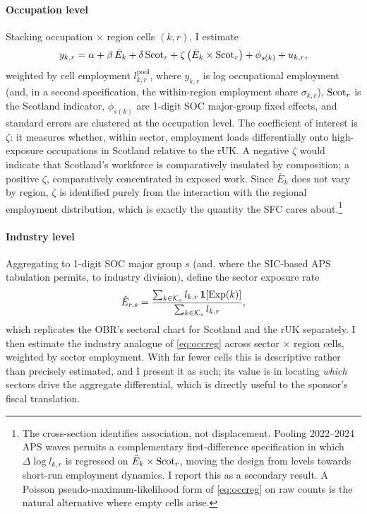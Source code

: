 \paragraph{Occupation level} Stacking occupation $\times$ region cells $(k,r)$, I estimate
\begin{equation}
y_{k,r}=\alpha+\beta\,\bar E_k+\delta\,\mathrm{Scot}_r+\zeta\,\big(\bar E_k\times \mathrm{Scot}_r\big)+\phi_{s(k)}+u_{k,r},
\label{eq:occreg}
\end{equation}
weighted by cell employment $l^{\mathrm{pool}}_{k,r}$, where $y_{k,r}$ is log occupational employment (and, in a second specification, the within-region employment share $\sigma_{k,r}$), $\mathrm{Scot}_r$ is the Scotland indicator, $\phi_{s(k)}$ are 1-digit SOC major-group fixed effects, and standard errors are clustered at the occupation level. The coefficient of interest is $\zeta$: it measures whether, within sector, employment loads differentially onto high-exposure occupations in Scotland relative to the rUK. A negative $\zeta$ would indicate that Scotland's workforce is comparatively insulated by composition; a positive $\zeta$, comparatively concentrated in exposed work. Since $\bar E_k$ does not vary by region, $\zeta$ is identified purely from the interaction with the regional employment distribution, which is exactly the quantity the SFC cares about.\footnote{The cross-section identifies association, not displacement. Pooling 2022--2024 APS waves permits a complementary first-difference specification in which $\Delta\log l_{k,r}$ is regressed on $\bar E_k\times\mathrm{Scot}_r$, moving the design from levels towards short-run employment dynamics. I report this as a secondary result. A Poisson pseudo-maximum-likelihood form of \eqref{eq:occreg} on raw counts is the natural alternative where empty cells arise.}

\paragraph{Industry level} Aggregating to 1-digit SOC major group $s$ (and, where the SIC-based APS tabulation permits, to industry division), define the sector exposure rate
\begin{equation}
\hat E_{r,s}=\frac{\sum_{k\in\mathcal{K}_s} l_{k,r}\,\mathbf{1}[\mathrm{Exp}(k)]}{\sum_{k\in\mathcal{K}_s} l_{k,r}},
\end{equation}
which replicates the OBR's sectoral chart for Scotland and the rUK separately. I then estimate the industry analogue of \eqref{eq:occreg} across sector $\times$ region cells, weighted by sector employment. With far fewer cells this is descriptive rather than precisely estimated, and I present it as such; its value is in locating \emph{which} sectors drive the aggregate differential, which is directly useful to the sponsor's fiscal translation.

